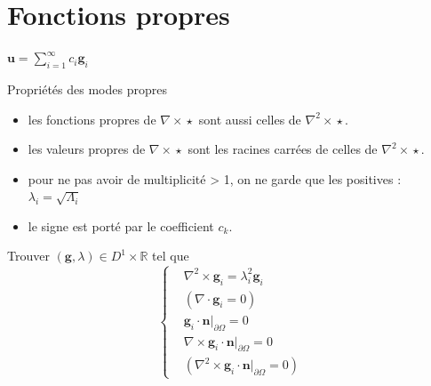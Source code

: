 \documentclass{beamer}
\newcommand{\rot}{{\nabla\times}}
\newcommand{\rott}{{\nabla^2\times}}
\renewcommand{\div}{{\nabla\cdot}}
\newcommand{\restr}{{\big\rvert_{\partial\Omega}}}
\begin{document}
\section{Fonctions propres}
\begin{frame}{$\mathbf{u}=\sum_{i=1}^\infty c_i\mathbf{g}_i$}
\begin{block}{Propriétés des modes propres}
\begin{itemize}
\item les fonctions propres de $\rot\star$ sont aussi celles de $\rott\star$.
\item les valeurs propres de $\rot\star$ sont les racines carrées de celles de $\rott\star$.
\item pour ne pas avoir de multiplicité > 1, on ne garde que les positives : $\lambda_i=\sqrt{\Lambda_i}$
\item le signe est porté par le coefficient $c_k$.
\end{itemize}
\end{block}
\begin{block}{Trouver $(\mathbf{g},\lambda)\in D^1\times \mathbb{R}$ tel que}
\[\left\{\begin{aligned}
&\rott  \mathbf{g}_i = \lambda_i^2 \mathbf{g}_i\\
&(\div \mathbf{g}_i = 0)\\
&\mathbf{g}_i\cdot \mathbf{n}\restr = 0\\
&\rot \mathbf{g}_i\cdot \mathbf{n}\restr = 0\\
&(\rott  \mathbf{g}_i\cdot \mathbf{n}\restr = 0)
\end{aligned}\right.\]
\end{block}
\end{frame}
\end{document}
